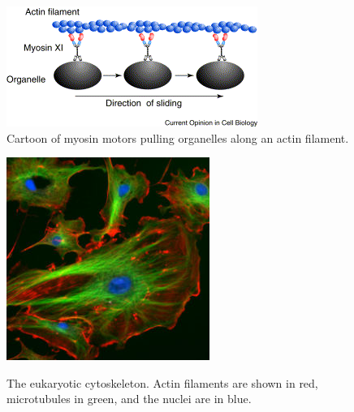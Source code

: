 \documentclass{../lab}
\begin{document}
\begin{figure}[h]
\begin{minipage}{0.32\linewidth}
\centering
    \href{http://experimentationlab.berkeley.edu/sites/default/files/images/Myosin.gif}{\includegraphics[width=\linewidth,keepaspectratio]{images/Myosin.png}} \\
    \caption{Cartoon of myosin motors pulling organelles along an actin filament.}
    \end{minipage}\hfill
\begin{minipage}{0.32\linewidth}
    \centering
    \href{http://experimentationlab.berkeley.edu/sites/default/files/images/250px-BMC_Cytoskeleton.jpg}{\includegraphics[width=\linewidth]{images/250px-BMC_Cytoskeleton.jpg}}
    \caption{The eukaryotic cytoskeleton. Actin filaments are shown in red, microtubules in green, and the nuclei are in blue.}

\end{minipage}
\end{figure}
\end{document}
